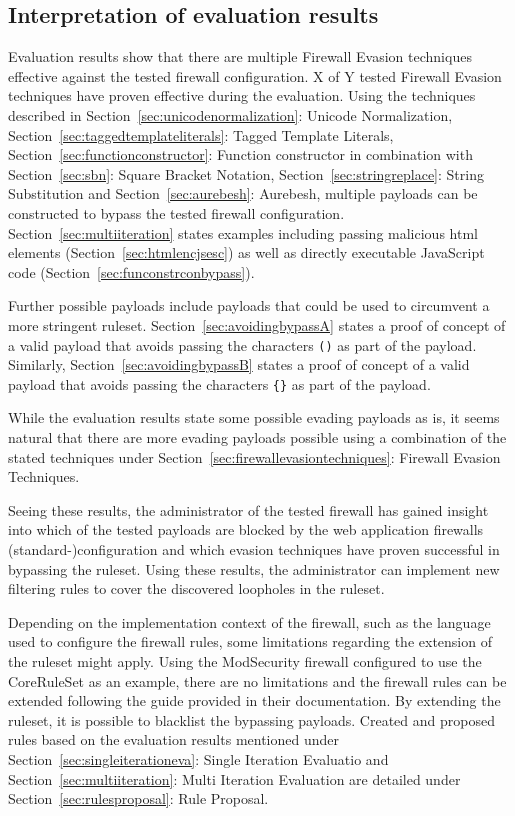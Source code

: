 \subsection{Interpretation of evaluation results}
\label{sec:evalinterpretation}
Evaluation results show that there are multiple Firewall Evasion techniques effective against the tested firewall configuration. {\color{red}X of Y} tested Firewall Evasion techniques have proven effective during the evaluation. Using the techniques described in Section~\ref{sec:unicodenormalization}: Unicode Normalization, Section~\ref{sec:taggedtemplateliterals}: Tagged Template Literals, Section~\ref{sec:functionconstructor}: Function constructor in combination with Section~\ref{sec:sbn}: Square Bracket Notation, Section~\ref{sec:stringreplace}: String Substitution and Section~\ref{sec:aurebesh}: Aurebesh, multiple payloads can be constructed to bypass the tested firewall configuration. Section~\ref{sec:multiiteration} states examples including passing malicious html elements (Section~\ref{sec:htmlencjsesc}) as well as directly executable JavaScript code (Section~\ref{sec:funconstrconbypass}). 

Further possible payloads include payloads that could be used to circumvent a more stringent ruleset.
Section~\ref{sec:avoidingbypassA} states a proof of concept of a valid payload that avoids passing the characters \verb|()| as part of the payload.
Similarly, Section~\ref{sec:avoidingbypassB} states a proof of concept of a valid payload that avoids passing the characters \verb|{}| as part of the payload. 

While the evaluation results state some possible evading payloads as is, it seems natural that there are more evading payloads possible using a combination of the stated techniques under Section~\ref{sec:firewallevasiontechniques}: Firewall Evasion Techniques.

Seeing these results, the administrator of the tested firewall has gained insight into which of the tested payloads are blocked by the web application firewalls (standard-)configuration and which evasion techniques have proven successful in bypassing the ruleset. Using these results, the administrator can implement new filtering rules to cover the discovered loopholes in the ruleset.

Depending on the implementation context of the firewall, such as the language used to configure the firewall rules, some limitations regarding the extension of the ruleset might apply. Using the ModSecurity firewall configured to use the CoreRuleSet as an example, there are no limitations and the firewall rules can be extended following the guide provided in their documentation. By extending the ruleset, it is possible to blacklist the bypassing payloads. Created and proposed rules based on the evaluation results mentioned under Section~\ref{sec:singleiterationeva}: Single Iteration Evaluatio and Section~\ref{sec:multiiteration}: Multi Iteration Evaluation are detailed under Section~\ref{sec:rulesproposal}: Rule Proposal. 

